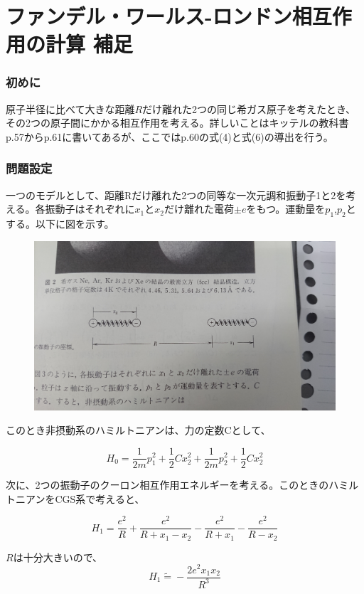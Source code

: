 \documentclass{jsarticle}
\begin{document}
\part{ファンデル・ワールス-ロンドン相互作用の計算 補足}
	\section{初めに}
	原子半径に比べて大きな距離$R$だけ離れた2つの同じ希ガス原子を考えたとき、その2つの原子間にかかる相互作用を考える。詳しいことはキッテルの教科書p.57からp.61に書いてあるが、ここではp.60の式(4)と式(6)の導出を行う。

	\section{問題設定}
	一つのモデルとして、距離Rだけ離れた2つの同等な一次元調和振動子1と2を考える。各振動子はそれぞれに$x_{1}$と$x_{2}$だけ離れた電荷$\pm e$をもつ。運動量を$p_{1}$,$p_2$とする。以下に図を示す。\\
	\begin{figure}[H]
		\centering
		\includegraphics[width=0.7\linewidth]{DSC_0001}
		\caption{}
		\label{fig:dsc0001}
	\end{figure}

	このとき非摂動系のハミルトニアンは、力の定数Cとして、

		\begin{equation}
			H_{0}=\frac{1}{2m}p_{1}^{2}+\frac{1}{2}Cx_{2}^{2}+\frac{1}{2m}p_{2}^{2}+\frac{1}{2}Cx_{2}^{2}
		\end{equation}

	次に、2つの振動子のクーロン相互作用エネルギーを考える。このときのハミルトニアンをCGS系で考えると、

		\begin{equation}
			H_{1}=\frac{e^{2}}{R}+\frac{e^{2}}{R+x_{1}-x_{2}}-\frac{e^{2}}{R+x_{1}}-\frac{e^{2}}{R-x_{2}}
		\end{equation}

	$R$は十分大きいので、
		\begin{equation}
			H_{1}\tilde{=}-\frac{2e^{2}x_{1}x_{2}}{R^{3}}
		\end{equation}
\end{document}
